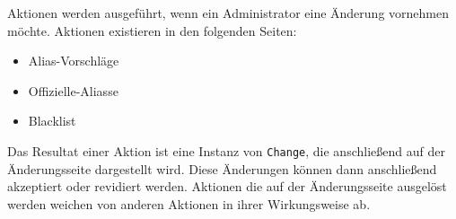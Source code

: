 Aktionen werden ausgeführt, wenn ein Administrator eine Änderung vornehmen möchte.
Aktionen existieren in den folgenden Seiten:

\begin{itemize}
    \item Alias-Vorschläge
    \item Offizielle-Aliasse
    \item Blacklist
\end{itemize}

Das Resultat einer Aktion ist eine Instanz von \verb#Change#, die anschließend auf der Änderungsseite dargestellt wird.
Diese Änderungen können dann anschließend akzeptiert oder revidiert werden.
Aktionen die auf der Änderungsseite ausgelöst werden weichen von anderen Aktionen in ihrer Wirkungsweise ab.